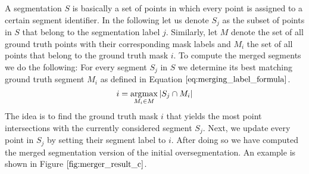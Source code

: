 A segmentation $S$ is basically a set of points in which every point is assigned to a certain segment identifier. In the following let us denote $S_j$ as the subset of points in $S$ that belong to the segmentation label $j$. Similarly, let $M$ denote the set of all ground truth points with their corresponding mask labels and $M_i$ the set of all points that belong to the ground truth mask $i$. To compute the merged segments we do the following: For every segment $S_j$ in $S$ we determine its best matching ground truth segment $M_i$ as defined in Equation $\ref{eq:merging_label_formula}$. 
\begin{equation}
i = \operatorname*{\arg\!\max}\limits_{M_i \in M} \left\vert{S_j \cap M_i}\right\vert
\label{eq:merging_label_formula}
\end{equation}
The idea is to find the ground truth mask $i$ that yields the most point intersections with the currently considered segment $S_j$. Next, we update every point in $S_j$ by setting their segment label to $i$. After doing so we have computed the merged segmentation version of the initial oversegmentation. An example is shown in Figure $\ref{fig:merger_result_c}$.

